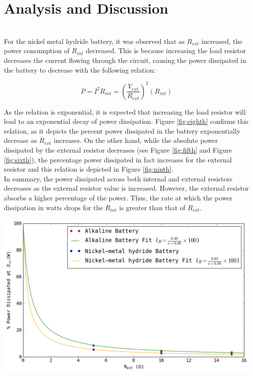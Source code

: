 \documentclass[journal]{IEEEtran}
\begin{document}
\section{Analysis and Discussion}\\

\noindent For the nickel metal hydride battery, it was observed that as $R_{ext}$ increased, the power consumption of $R_{int}$ decreased. This is because increasing the load resistor decreases the current flowing through the circuit, causing the power dissipated in the battery to decrease with the following relation:

\begin{equation}
P = I^{2}R_{int} = (\frac{V_{ext}}{R_{ext}})^2(R_{int})
\label{eq:powercalc}
\end{equation}

\noindent As the relation is exponential, it is expected that increasing the load resistor will lead to an exponential decay of power dissipation. Figure \ref{fig:eighth} confirms this relation, as it depicts the percent power dissipated in the battery exponentially decrease as $R_{ext}$ increases. On the other hand, while the absolute power dissipated by the external resistor decreases (see Figure \ref{fig:fifth} and Figure \ref{fig:sixth}), the percentage power dissipated in fact increases for the external resistor and this relation is depicted in Figure \ref{fig:ninth}.\\

\noindent In summary, the power dissipated across both internal and external resistors decreases as the external resistor value is increased. However, the external resistor absorbs a higher percentage of the power. Thus, the rate at which the power dissipation in watts drops for the $R_{int}$ is greater than that of $R_{ext}$.

\begingroup
    \medskip
    \centering
    \includegraphics[width = \columnwidth]{images/lab3_graph1_1.png}
    \label{fig:eighth}
\endgroup
\end{document}
